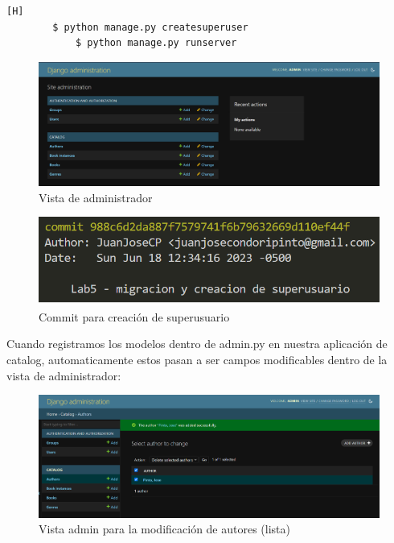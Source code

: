 \documentclass{article}
\begin{document}
	\begin{lstlisting}[language=bash,caption={Creando superusuaio y corriendo el servidor}][H]
		$ python manage.py createsuperuser
            $ python manage.py runserver
	\end{lstlisting}

    \begin{figure}[H]
        \centering
        \includegraphics[scale=0.42]{img/img2.png}
        \caption{Vista de administrador}
        \label{fig:imagen}
    \end{figure}

    \begin{figure}[H]
        \centering
        \includegraphics[scale=0.5]{img/img2_commit.png}
        \caption{Commit para creación de superusuario}
        \label{fig:imagen}
    \end{figure}

    Cuando registramos los modelos dentro de admin.py en nuestra aplicación de catalog, automaticamente estos pasan a ser campos modificables dentro de la vista de administrador:

    \begin{figure}[H]
        \centering
        \includegraphics[scale=0.42]{img/img3.png}
        \caption{Vista admin para la modificación de autores (lista)}
        \label{fig:imagen}
    \end{figure}
\end{document}
